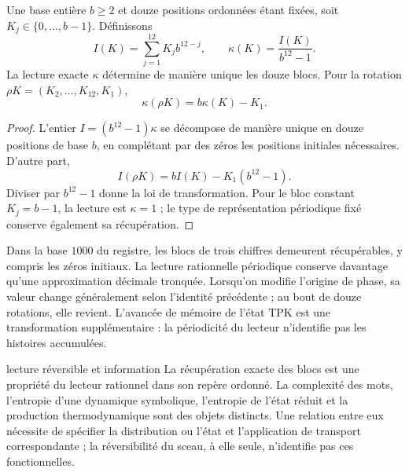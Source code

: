 \begin{proposition}
Une base entière $b\ge2$ et douze positions ordonnées étant fixées, soit
$K_j\in\{0,\ldots,b-1\}$. Définissons
\[
 I(K)=\sum_{j=1}^{12}K_jb^{12-j},\qquad
 \kappa(K)=\frac{I(K)}{b^{12}-1}.
\]
La lecture exacte $\kappa$ détermine de manière unique les douze blocs.
Pour la rotation $\rho K=(K_2,\ldots,K_{12},K_1)$,
\[
 \boxed{\kappa(\rho K)=b\kappa(K)-K_1.}
\]
\end{proposition}
\begin{proof}
L'entier $I=(b^{12}-1)\kappa$ se décompose de manière unique en douze
positions de base $b$, en complétant par des zéros les positions initiales
nécessaires. D'autre part,
\[
 I(\rho K)=bI(K)-K_1(b^{12}-1).
\]
Diviser par $b^{12}-1$ donne la loi de transformation. Pour le bloc
constant $K_j=b-1$, la lecture est $\kappa=1$ ; le type de représentation
périodique fixé conserve également sa récupération.
\end{proof}

Dans la base $1000$ du registre, les blocs de trois chiffres demeurent
récupérables, y compris les zéros initiaux. La lecture rationnelle
périodique conserve davantage qu'une approximation décimale tronquée.
Lorsqu'on modifie l'origine de phase, sa valeur change généralement selon
l'identité précédente ; au bout de douze rotations, elle revient.
L'avancée de mémoire de l'état TPK est une transformation supplémentaire :
la périodicité du lecteur n'identifie pas les histoires accumulées.

\begin{apunte}{lecture réversible et information}
La récupération exacte des blocs est une propriété du lecteur
rationnel dans son repère ordonné. La complexité des mots, l’entropie
d’une dynamique symbolique, l’entropie de l’état réduit et la
production thermodynamique sont des objets distincts. Une relation entre
eux nécessite de spécifier la distribution ou l’état et l’application de
transport correspondante ; la réversibilité du sceau, à elle seule,
n’identifie pas ces fonctionnelles.
\end{apunte}


